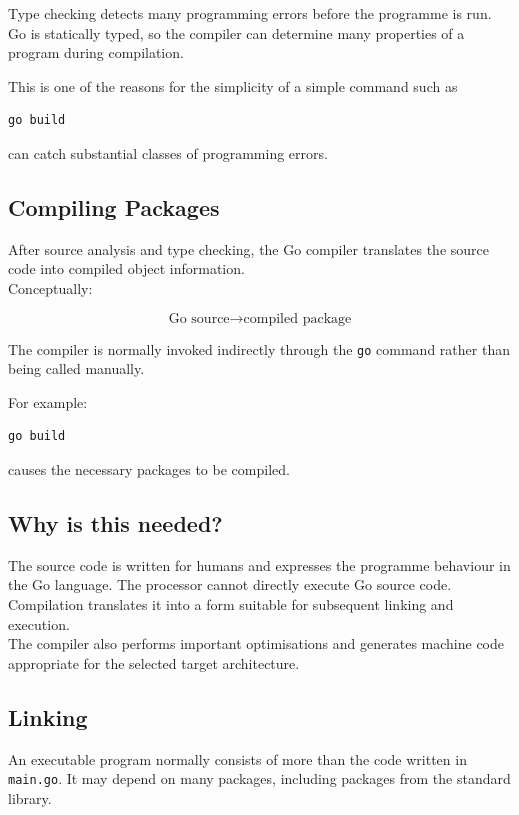 Type checking detects many programming errors before the programme is
run.  Go is statically typed, so the compiler can determine many
properties of a program during compilation.

This is one of the reasons for the simplicity of a simple command such as

\begin{lstlisting}
go build
\end{lstlisting}

can catch substantial classes of programming errors.

\subsection{Compiling Packages}

After source analysis and type checking, the Go compiler translates the
source code into compiled object information.\\

Conceptually:

\[
\text{Go source}
\longrightarrow
\text{compiled package}
\]

The compiler is normally invoked indirectly through the \texttt{go}
command rather than being called manually.

For example:

\begin{lstlisting}
go build
\end{lstlisting}

causes the necessary packages to be compiled.

\subsection*{Why is this needed?}

The source code is written for humans and expresses the programme behaviour in the
Go language.  The processor cannot directly execute Go source code.
Compilation translates it into a form suitable for subsequent linking
and execution.\\

The compiler also performs important optimisations and generates
machine code appropriate for the selected target architecture.

\subsection{Linking}

An executable program normally consists of more than the code written
in \texttt{main.go}.  It may depend on many packages, including
packages from the standard library.\\

